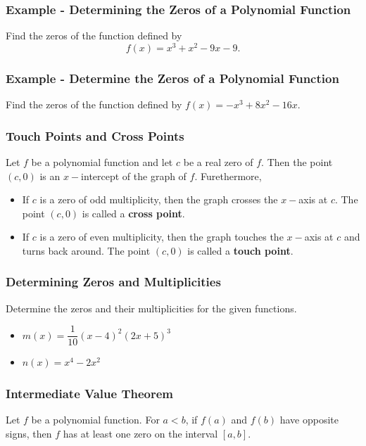 \documentclass{beamer}
\begin{document}
\begin{frame}
    \frametitle{Example - Determining the Zeros of a Polynomial Function}

    Find the zeros of the function defined by 
    \[f(x)=x^3 +x^2 -9x -9 .\]

    

\end{frame}

\begin{frame}
    \frametitle{Example - Determine the Zeros of a Polynomial Function}

Find the zeros of the function defined by \(f(x)=-x^3 +8x^2 - 16x\).    

\end{frame}

\begin{frame}
    \frametitle{Touch Points and Cross Points}      

    Let \(f\) be a polynomial function and let \(c\) be a real zero of \(f\). Then the point \((c,0)\) is an \(x-\)intercept of the graph of \(f\). Furethermore, 
    \begin{itemize}
        \item If \(c\) is a zero of odd multiplicity, then the graph crosses the \(x-\)axis at \(c\). The point \((c,0)\) is called a \textbf{cross point}. \pause
        \item If \(c\) is a zero of even multiplicity, then the graph touches the \(x-\)axis at \(c\) and turns back around. The point \((c,0)\) is called a \textbf{touch point}.
    \end{itemize}   

\end{frame}

\begin{frame}
    \frametitle{Determining Zeros and Multiplicities}

    Determine the zeros and their multiplicities for the given functions. 
    \begin{itemize}
        \item \(m(x)=\dfrac{1}{10}(x-4)^2(2x+5)^3\) \pause
        \item \(n(x)=x^4 - 2x^2\)
    \end{itemize}

\end{frame}

\begin{frame}
    \frametitle{Intermediate Value Theorem}

    Let \(f\) be a polynomial function. For \(a<b \), if \(f(a)\) and \(f(b)\) have opposite signs, then \(f\) has  at least one zero on the interval \([a,b]\).  

\end{frame}
\end{document}
